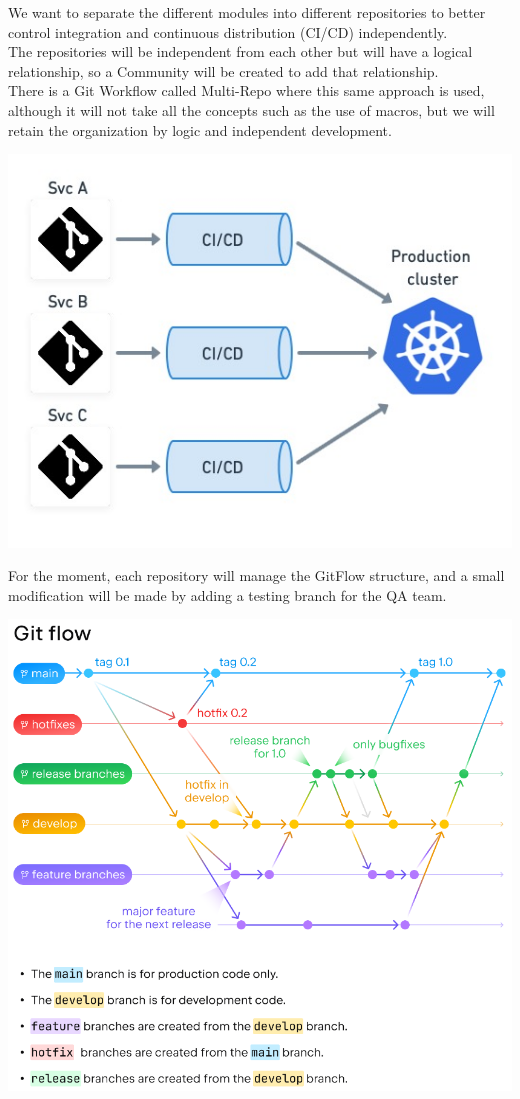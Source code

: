 \documentclass{article}
\begin{document}
We want to separate the different modules into different repositories to
better control integration and continuous distribution (CI/CD)
independently.\\
The repositories will be independent from each other but will have a
logical relationship, so a Community will be created to add that
relationship.\\
There is a Git Workflow called Multi-Repo where this same approach is
used, although it will not take all the concepts such as the use of
macros, but we will retain the organization by logic and independent
development.~

\includegraphics[width=\textwidth]{microdeployment.jpg}

For the moment, each repository will manage the GitFlow structure, and a
small modification will be made by adding a testing branch for the QA
team.

\includegraphics[width=\textwidth]{gitflow.png}
\end{document}
